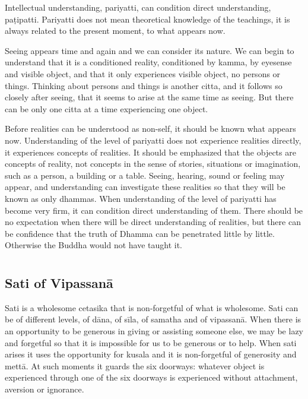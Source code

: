 {Intellectual understanding, pariyatti, can condition direct
understanding, paṭipatti. Pariyatti does not mean theoretical knowledge
of the teachings, it is always related to the present moment, to what
appears now.

Seeing appears time and again and we can consider its nature.
We can begin to understand that it is a conditioned reality, conditioned
by kamma, by eyesense and visible object, and that it only experiences
visible object, no persons or things. Thinking about persons and things
is another citta, and it follows so closely after seeing, that it seems
to arise at the same time as seeing. But there can be only one citta at
a time experiencing one object. 

Before realities can be understood as non-self, it should be
known what appears now. Understanding of the level of pariyatti does not
experience realities directly, it experiences concepts of realities.
It should be emphasized that the objects
are concepts of reality, not concepts in the sense of
stories, situations or imagination, such as a person, a building or a
table. Seeing, hearing, sound or feeling may appear, and understanding
can investigate these realities so that they will be known as only
dhammas. When understanding of the level of pariyatti has become very
firm, it can condition direct understanding of them. There should be no
expectation when there will be direct understanding of realities, but
there can be confidence that the truth of Dhamma can be penetrated
little by little. Otherwise the Buddha would not have taught it.



\chapter[Sati of Vipassanā]{}
\section*{Sati of Vipassanā}

Sati is a wholesome cetasika that is non-forgetful of what is
wholesome. Sati can be of different levels, of dāna, of sīla, of samatha
and of vipassanā. When there is an opportunity to be generous in giving
or assisting someone else, we may be lazy and forgetful so that it is
impossible for us to be generous or to help. When sati arises it uses
the opportunity for kusala and it is non-forgetful of generosity and
mettā. At such moments it guards the six doorways: whatever object is
experienced through one of the six doorways is experienced without
attachment, aversion or ignorance.

}
